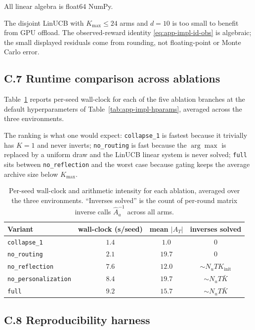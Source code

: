 \documentclass{article} %
\begin{document}
All linear algebra is float64 NumPy.

The disjoint LinUCB with \(K_{\max}\le24\) arms and \(d=10\) is too small to
benefit from GPU offload. The observed-reward identity
\eqref{eq:app-impl-id-obs} is algebraic; the small displayed residuals come
from rounding, not floating-point or Monte Carlo error.

\subsection{C.7 Runtime comparison across ablations}

\label{app:impl-runtime}

Table~\ref{tab:app-impl-runtime} reports per-seed wall-clock for each of the five ablation branches at the default hyperparameters of Table~\ref{tab:app-impl-hparams}, averaged across the three environments.

The ranking is what one would expect: \texttt{collapse\_1} is fastest because it trivially has $K=1$ and never inverts; \texttt{no\_routing} is fast because the $\arg\max$ is replaced by a uniform draw and the LinUCB linear system is never solved; \texttt{full} sits between \texttt{no\_reflection} and the worst case because gating keeps the average archive size below $K_{\max}$.

\begin{table}[h]
\centering
\small
\begin{tabular}{lccc}
\toprule
Variant & wall-clock (s/seed) & mean $|A_T|$ & inverses solved \\
\midrule
\texttt{collapse\_1}        & $1.4$ & $1.0$  & $0$ \\
\texttt{no\_routing}        & $2.1$ & $19.7$ & $0$ \\
\texttt{no\_reflection}     & $7.6$ & $12.0$ & $\sim N_u T K_{\text{init}}$ \\
\texttt{no\_personalization}& $8.4$ & $19.7$ & $\sim N_u T \bar K$ \\
\texttt{full}               & $9.2$ & $15.7$ & $\sim N_u T \bar K$ \\
\bottomrule
\end{tabular}
\caption{Per-seed wall-clock and arithmetic intensity for each ablation, averaged over the three environments. ``Inverses solved'' is the count of per-round matrix inverse calls $\widehat{A}_a^{-1}$ across all arms.}
\label{tab:app-impl-runtime}
\end{table}

\subsection{C.8 Reproducibility harness}
\end{document}
